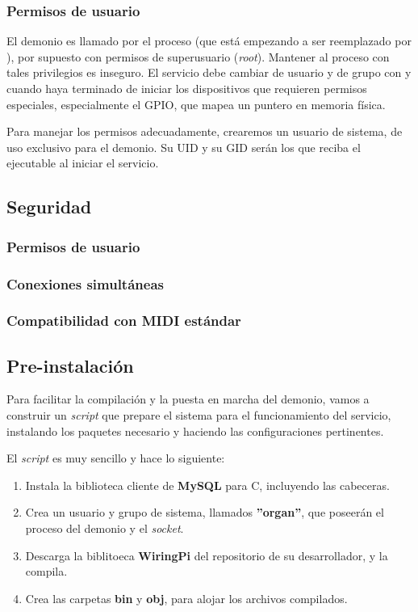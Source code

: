 \subsubsection{Permisos de usuario}

El demonio es llamado por el proceso  (que está empezando a ser reemplazado por ), por supuesto con permisos de superusuario (\textit{root}). Mantener al proceso con tales privilegios es inseguro. El servicio debe cambiar de usuario y de grupo con  y  cuando haya terminado de iniciar los dispositivos que requieren permisos especiales, especialmente el \acrshort{GPIO}, que mapea un puntero en memoria física.

Para manejar los permisos adecuadamente, crearemos un usuario de sistema, de uso exclusivo para el demonio. Su \acrshort{UID} y su \acrshort{GID} serán los que reciba el ejecutable al iniciar el servicio.

\subsection{Seguridad}
\subsubsection{Permisos de usuario}
\subsubsection{Conexiones simultáneas}
\subsubsection{Compatibilidad con MIDI estándar}

\subsection{Pre-instalación}

Para facilitar la compilación y la puesta en marcha del demonio, vamos a construir un \textit{script} que prepare el sistema para el funcionamiento del servicio, instalando los paquetes necesario y haciendo las configuraciones pertinentes.

El \textit{script} es muy sencillo y hace lo siguiente:

\begin{enumerate}
	\item Instala la biblioteca cliente de \textbf{MySQL} para C, incluyendo las cabeceras.
	\item Crea un usuario y grupo de sistema, llamados \textbf{''organ''}, que poseerán el proceso del demonio y el \textit{socket}.
	\item Descarga la biblitoeca \textbf{WiringPi} del repositorio de su desarrollador, y la compila.
	\item Crea las carpetas \textbf{bin} y \textbf{obj}, para alojar los archivos compilados.
\end{enumerate}

